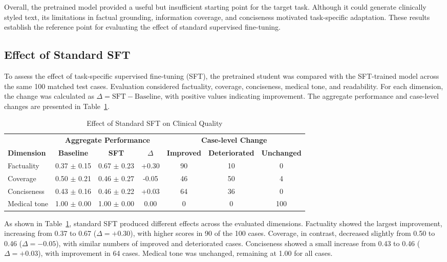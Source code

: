 \documentclass[ %
                    author={Aman Kumar Singh},
                supervisor={Dr. Edwin Simpson},
                    degree={MSc},
                     title={Quality-Aware Knowledge Distillation of Large Language Models for Efficient Personalised Clinical Report Generation},
                  subtitle={},
                      type={},
                      year={2021}]{dissertation}
\begin{document}
Overall, the pretrained model provided a useful but insufficient
starting point for the target task. Although it could generate
clinically styled text, its limitations in factual grounding,
information coverage, and conciseness motivated task-specific
adaptation. These results establish the reference point for evaluating
the effect of standard supervised fine-tuning.
\subsection{Effect of Standard SFT}
\label{sec:effect_standard_sft}
To assess the effect of task-specific supervised fine-tuning (SFT), the
pretrained student was compared with the SFT-trained model across the
same 100 matched test cases. Evaluation considered factuality, coverage,
conciseness, medical tone, and readability. For each dimension, the
change was calculated as $\Delta = \mathrm{SFT} - \mathrm{Baseline}$,
with positive values indicating improvement. The aggregate performance
and case-level changes are presented in Table~\ref{tab:baseline_sft}.\vspace{-15pt}

\begin{table}[htbp]
\centering
\footnotesize
\caption{Effect of Standard SFT on Clinical Quality}
\label{tab:baseline_sft}
\begin{tabular}{lccc|ccc}
\hline
& \multicolumn{3}{c|}{\textbf{Aggregate Performance}}
& \multicolumn{3}{c}{\textbf{Case-level Change}} \\
\cline{2-7}
\textbf{Dimension} &
\textbf{Baseline} &
\textbf{SFT} &
\textbf{$\Delta$} &
\textbf{Improved} &
\textbf{Deteriorated} &
\textbf{Unchanged} \\
\hline
Factuality
& 0.37 $\pm$ 0.15
& 0.67 $\pm$ 0.23
& +0.30
& 90
& 10
& 0 \\

Coverage
& 0.50 $\pm$ 0.21
& 0.46 $\pm$ 0.27
& -0.05
& 46
& 50
& 4 \\

Conciseness
& 0.43 $\pm$ 0.16
& 0.46 $\pm$ 0.22
& +0.03
& 64
& 36
& 0 \\

Medical tone
& 1.00 $\pm$ 0.00
& 1.00 $\pm$ 0.00
& 0.00
& 0
& 0
& 100 \\

\hline
\end{tabular}
\end{table}

As shown in Table~\ref{tab:baseline_sft}, standard SFT produced
different effects across the evaluated dimensions. Factuality showed
the largest improvement, increasing from 0.37 to 0.67
($\Delta=+0.30$), with higher scores in 90 of the 100 cases. Coverage,
in contrast, decreased slightly from 0.50 to 0.46 ($\Delta=-0.05$), with
similar numbers of improved and deteriorated cases. Conciseness showed a
small increase from 0.43 to 0.46 ($\Delta=+0.03$), with improvement in
64 cases. Medical tone was unchanged, remaining at 1.00 for all cases.
\end{document}
